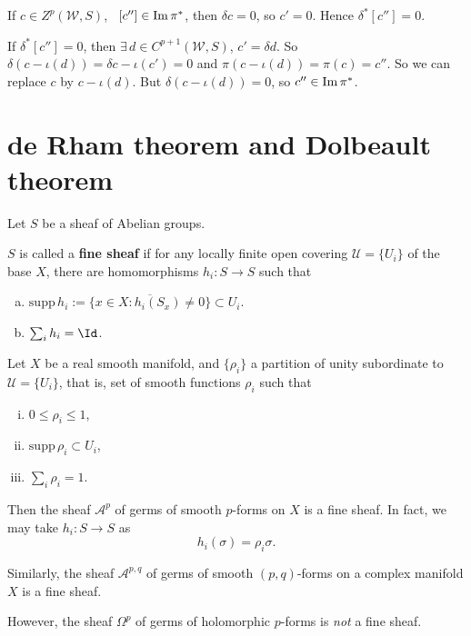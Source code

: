 \documentclass[12pt]{article}
\begin{document}
If \(c\in Z^p(\mathcal{W},S)\), \ie\ \([c'']\in \operatorname{Im}\pi^*\), then \(\delta c=0\),
so \(c'=0\). Hence \(\delta^*[c'']=0\).

If \(\delta^*[c'']=0\), then \(\exists\,d\in C^{p+1}(\mathcal{W},S)\), \(c'=\delta d\).
So \(\delta(c-\iota(d))=\delta c-\iota(c')=0\) and \(\pi(c-\iota(d))=\pi(c)=c''\).
So we can replace \(c\) by \(c-\iota(d)\). But \(\delta(c-\iota(d))=0\), so
\(c''\in \operatorname{Im}\pi^*\).

\section{de Rham theorem and Dolbeault theorem}

Let \(S\) be a sheaf of Abelian groups.
\begin{definition}
  \(S\) is called a \textbf{fine sheaf} if for any locally finite open covering
  \(\mathcal{U}=\{U_i\}\) of the base \(X\), there are homomorphisms
  \(h_i\colon S\to S\) such that
  \begin{enumerate}[(a)]
  \item \(\mathrm{supp}\,h_i:=\overline{\{x\in X:h_i(S_x)\neq 0\}}\subset U_i\).
  \item \(\sum_i h_i=\Id\).
  \end{enumerate}
\end{definition}
\begin{example}
  Let \(X\) be a real smooth manifold, and \(\{\rho_i\}\) a partition of unity
  subordinate to \(\mathcal{U}=\{U_i\}\), that is, set of smooth functions \(\rho_i\)
  such that
  \begin{enumerate}[(i)]
  \item \(0\le \rho_i\le 1\),
  \item \(\mathrm{supp}\,\rho_i\subset U_i\),
  \item \(\sum_i \rho_i=1\).
  \end{enumerate}
  Then the sheaf \(\mathcal{A}^p\) of germs of smooth \(p\)-forms on \(X\) is a fine
  sheaf. In fact, we may take \(h_i\colon S\to S\) as \[
    h_i(\sigma)=\rho_i \sigma
  .\] 
\end{example}
\begin{example}
  Similarly, the sheaf \(\mathcal{A}^{p,q}\) of germs of smooth \((p,q)\)-forms on
  a complex manifold \(X\) is a fine sheaf.
\end{example}
\begin{example}
  However, the sheaf \(\Omega^{p}\) of germs of holomorphic \(p\)-forms is \emph{not}
  a fine sheaf.
\end{example}
\end{document}
